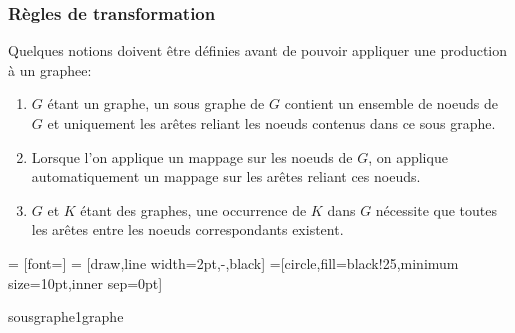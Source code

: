 \documentclass[a4paper, 12pt]{article}
\begin{document}
  \subsubsection{Règles de transformation}

  Quelques notions doivent être définies avant de pouvoir appliquer une production à un graphee:

  \begin{enumerate}
    \item \(G\) étant un graphe, un sous graphe de \(G\) contient un ensemble de noeuds de \(G\) et uniquement les arêtes reliant les noeuds contenus dans ce sous graphe.

    \item Lorsque l'on applique un mappage sur les noeuds de \(G\), on applique automatiquement un mappage sur les arêtes reliant ces noeuds.

    \item \(G\) et \(K\) étant des graphes, une occurrence de \(K\) dans \(G\) nécessite que toutes les arêtes entre les noeuds correspondants existent.

  \end{enumerate}

   = [font=\small]
   = [draw,line width=2pt,-,black]
  =[circle,fill=black!25,minimum size=10pt,inner sep=0pt]
  \begin{myfig}{sousgraphe1}{graphe}
  \end{myfig}
\end{document}
